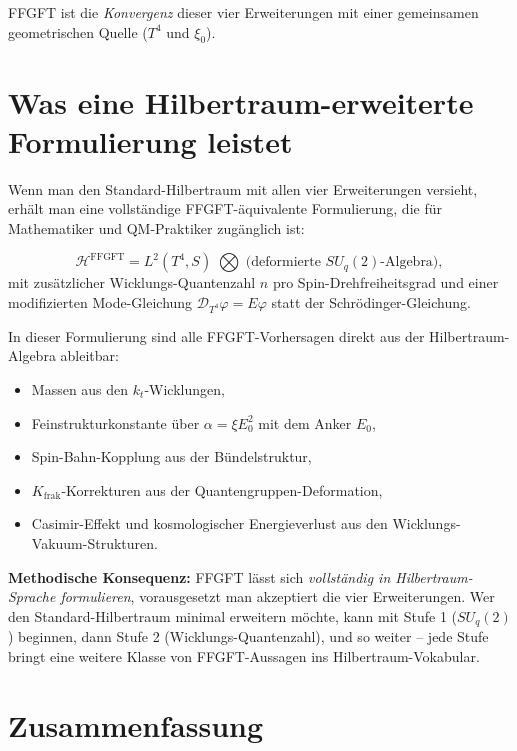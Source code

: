 FFGFT ist die \emph{Konvergenz} dieser vier Erweiterungen mit einer
gemeinsamen geometrischen Quelle ($T^4$ und $\xi_0$).

\section{Was eine Hilbertraum-erweiterte Formulierung leistet}

Wenn man den Standard-Hilbertraum mit allen vier Erweiterungen
versieht, erhält man eine vollständige FFGFT-äquivalente
Formulierung, die für Mathematiker und QM-Praktiker zugänglich ist:

\begin{equation}
  \mathcal{H}^{\text{FFGFT}}
  = L^2(T^4, S) \;\bigotimes\; \text{(deformierte $SU_q(2)$-Algebra)},
\end{equation}
mit zusätzlicher Wicklungs-Quantenzahl $n$ pro
Spin-Drehfreiheitsgrad und einer modifizierten Mode-Gleichung
$\mathcal{D}_{T^4}\varphi = E \varphi$ statt der
Schrödinger-Gleichung.

In dieser Formulierung sind alle FFGFT-Vorhersagen direkt aus der
Hilbertraum-Algebra ableitbar:
\begin{itemize}[leftmargin=2em,itemsep=2pt,topsep=2pt]
  \item Massen aus den $k_t$-Wicklungen,
  \item Feinstrukturkonstante über $\alpha = \xi E_0^2$ mit dem Anker $E_0$,
  \item Spin-Bahn-Kopplung aus der Bündelstruktur,
  \item $K_{\text{frak}}$-Korrekturen aus der Quantengruppen-Deformation,
  \item Casimir-Effekt und kosmologischer Energieverlust aus den
        Wicklungs-Vakuum-Strukturen.
\end{itemize}

\textbf{Methodische Konsequenz:} FFGFT lässt sich \emph{vollständig
in Hilbertraum-Sprache formulieren}, vorausgesetzt man akzeptiert die
vier Erweiterungen. Wer den Standard-Hilbertraum minimal erweitern
möchte, kann mit Stufe 1 ($SU_q(2)$) beginnen, dann Stufe 2
(Wicklungs-Quantenzahl), und so weiter -- jede Stufe bringt eine
weitere Klasse von FFGFT-Aussagen ins Hilbertraum-Vokabular.

\section{Zusammenfassung}

